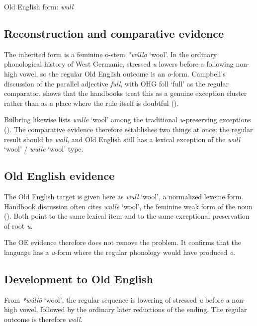 \documentclass[
  british,
  a4paper,
  openany]{book}
\providecommand{\Recon}[1]{\emph{*#1}}
{\catcode`→=\active \global\def→{\ensuremath{\rightarrow}}}
\providecommand{\Recon}[1]{\emph{*#1}}
{\catcode`→=\active \global\def→{\ensuremath{\rightarrow}}}
\begin{document}
Old English form: \emph{wull}

\subsection{Reconstruction and comparative
evidence}\label{reconstruction-and-comparative-evidence-146}

The inherited form is a feminine ō-stem \Recon{wúllō} `wool'. In the
ordinary phonological history of West Germanic, stressed \emph{u} lowers
before a following non-high vowel, so the regular Old English outcome is
an \emph{o}-form. Campbell's discussion of the parallel adjective
\emph{full}, with OHG {foll} `full' as the regular comparator, shows
that the handbooks treat this as a genuine exception cluster rather than
as a place where the rule itself is doubtful
().

Bülbring likewise lists {\emph{wulle}} `wool' among the traditional
\emph{u}-preserving exceptions (). The comparative evidence therefore establishes two
things at once: the regular result should be \emph{woll}, and Old
English still has a lexical exception of the {\emph{wull}} `wool' /
{\emph{wulle}} `wool' type.

\subsection{Old English evidence}\label{old-english-evidence-146}

The Old English target is given here as {\emph{wull}} `wool', a
normalized lexeme form. Handbook discussion often cites {\emph{wulle}}
`wool', the feminine weak form of the noun
(). Both point to
the same lexical item and to the same exceptional preservation of root
\emph{u}.

The OE evidence therefore does not remove the problem. It confirms that
the language has a \emph{u}-form where the regular phonology would have
produced \emph{o}.

\subsection{Development to Old
English}\label{development-to-old-english-146}

From \Recon{wúllō} `wool', the regular sequence is lowering of stressed
\emph{u} before a non-high vowel, followed by the ordinary later
reductions of the ending. The regular outcome is therefore \emph{woll}.
\end{document}
